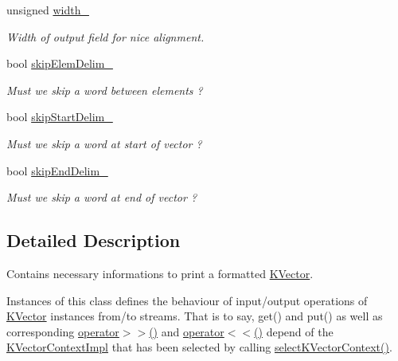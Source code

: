 \begin{DoxyCompactItemize}
unsigned \mbox{\hyperlink{classKalman_1_1KVectorContextImpl_a40cf49f7c19b13b1535952d5c7848fdb}{width\+\_\+}}
\begin{DoxyCompactList}\small\item\em Width of output field for nice alignment. \end{DoxyCompactList}\item 
\mbox{\label{classKalman_1_1KVectorContextImpl_abce74f8b351e0d3c3570569b352ae0f1}} 
bool \mbox{\hyperlink{classKalman_1_1KVectorContextImpl_abce74f8b351e0d3c3570569b352ae0f1}{skip\+Elem\+Delim\+\_\+}}
\begin{DoxyCompactList}\small\item\em Must we skip a word between elements ? \end{DoxyCompactList}\item 
\mbox{\label{classKalman_1_1KVectorContextImpl_a3a89bd482928a2dff2ce5ee393dceeac}} 
bool \mbox{\hyperlink{classKalman_1_1KVectorContextImpl_a3a89bd482928a2dff2ce5ee393dceeac}{skip\+Start\+Delim\+\_\+}}
\begin{DoxyCompactList}\small\item\em Must we skip a word at start of vector ? \end{DoxyCompactList}\item 
\mbox{\label{classKalman_1_1KVectorContextImpl_aec4f128d468d58f2422ac9c6c0886a26}} 
bool \mbox{\hyperlink{classKalman_1_1KVectorContextImpl_aec4f128d468d58f2422ac9c6c0886a26}{skip\+End\+Delim\+\_\+}}
\begin{DoxyCompactList}\small\item\em Must we skip a word at end of vector ? \end{DoxyCompactList}\end{DoxyCompactItemize}


\subsection{Detailed Description}
Contains necessary informations to print a formatted {\ttfamily \mbox{\hyperlink{classKalman_1_1KVector}{K\+Vector}}}. 

Instances of this class defines the behaviour of input/output operations of {\ttfamily \mbox{\hyperlink{classKalman_1_1KVector}{K\+Vector}}} instances from/to streams. That is to say, {\ttfamily get()} and {\ttfamily put()} as well as corresponding {\ttfamily \mbox{\hyperlink{namespaceKalman_a72ce00e837fa126ab3961f879e3d8b87}{operator$>$$>$()}}} and {\ttfamily \mbox{\hyperlink{namespaceKalman_a531684dadbec9b34313492f6d5121598}{operator$<$$<$()}}} depend of the {\ttfamily \mbox{\hyperlink{classKalman_1_1KVectorContextImpl}{K\+Vector\+Context\+Impl}}} that has been selected by calling {\ttfamily \mbox{\hyperlink{namespaceKalman_af72a4d89b04c7ed383878315b0895834}{select\+K\+Vector\+Context()}}}. 

